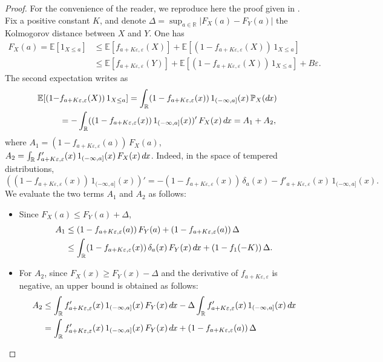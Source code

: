 \documentclass[envcountsame]{svmult}
\newcommand{\R}{\mathbb{R}}
\newcommand{\esper}{\mathbb{E}}
\newcommand{\proba}{\mathbb{P}}
\newcommand{\eps}{\varepsilon}
\newcommand{\DD}[1]{\,d\hspace*{-0.3mm}{#1}}
\begin{document}
\begin{proof}
For the convenience of the reader, we reproduce here the proof given in \cite{MN15}. Fix a positive constant $K$, and denote $\Delta=\sup_{a \in \R}|F_X(a)-F_Y(a)|$ the Kolmogorov distance between $X$ and $Y$. One has
\begin{align}F_X(a) = \esper[1_{X \leq a}] &\leq \esper[f_{a+K\eps,\eps}(X)] + \esper[(1-f_{a+K\eps,\eps}(X))\,1_{X \leq a}] \nonumber\\
&\leq \esper[f_{a+K\eps,\eps}(Y)] + \esper[(1-f_{a+K\eps,\eps}(X))\,1_{X \leq a}] + B\eps.
\label{eq:UB_FX}
\end{align}
The second expectation writes as
\begin{align*}
\esper[(1-&f_{a+K\eps,\eps}(X))\,1_{X \leq a}]=\int_{\R} (1-f_{a+K\eps,\eps}(x))\,1_{(-\infty,a]}(x)\, \proba_X(\!\DD{x})\\
&=-\int_{\R} ((1-f_{a+K\eps,\eps}(x))\,1_{(-\infty,a]}(x))'\, F_X(x)\DD{x} = A_1+A_2,
\end{align*}
where $A_1=(1-f_{a+K\eps,\eps}(a))\,F_X(a)$, $A_2=\int_{\R} f_{a+K\eps,\eps}'(x)\,1_{(-\infty,a]}(x)\, F_X(x)\DD{x}$.
Indeed, in the space of tempered distributions,
$((1-f_{a+K\eps,\eps}(x))\,1_{(-\infty,a]}(x))' = -(1-f_{a+K\eps,\eps}(x))\,\delta_a(x)-f'_{a+K\eps,\eps}(x)\,1_{(-\infty,a]}(x).$
We evaluate the two terms $A_1$ and $A_2$ as follows:
\begin{itemize}
	\item Since $F_X(a) \leq F_Y(a)+\Delta$, 
\begin{align*}
A_1 &\leq  (1-f_{a+K\eps,\eps}(a))\, F_Y(a) + (1-f_{a+K\eps,\eps}(a))\,\Delta \\
&\leq \int_{\R} (1-f_{a+K\eps,\eps}(x))\,\delta_a(x)\, F_Y(x)\DD{x} + (1-f_{1}(-K))\,\Delta .
\end{align*}
\item For $A_2$, since $F_X(x)\geq F_Y(x)-\Delta$ and the derivative of $f_{a+K\eps,\eps}$ is negative, an upper bound is obtained as follows:
\begin{align*}A_2 &\le \int_{\R} f_{a+K\eps,\eps}'(x)\,1_{(-\infty,a]}(x)\, F_Y(x)\DD{x} - \Delta\int_{\R}f_{a+K\eps,\eps}'(x)\,1_{(-\infty,a]}(x)\DD{x} \\
&= \int_{\R} f_{a+K\eps,\eps}'(x)\,1_{(-\infty,a]}(x)\, F_Y(x)\DD{x} +  (1-f_{a+K\eps,\eps}(a))\,\Delta\\

\end{align*}
\end{itemize}
\end{proof}
\end{document}
